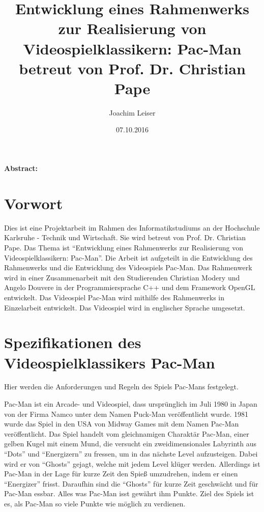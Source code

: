 \documentclass[a4paper, 11pt]{article}
\begin{document}
\author{Joachim Leiser}
\title{Entwicklung eines Rahmenwerks zur Realisierung von Videospielklassikern: Pac-Man betreut von Prof. Dr. Christian Pape}
\date{07.10.2016}
\maketitle

\pagebreak

\textbf{Abstract:}



\tableofcontents

\pagebreak

\section{Vorwort} %

Dies ist eine Projektarbeit im Rahmen des Informatikstudiums an der Hochschule Karlsruhe - Technik und Wirtschaft. Sie wird betreut von Prof. Dr. Christian Pape. Das Thema ist "`Entwicklung eines Rahmenwerks zur Realisierung von Videospielklassikern: Pac-Man"'. Die Arbeit ist aufgeteilt in die Entwicklung des Rahmenwerks und die Entwicklung des Videospiels Pac-Man. Das Rahmenwerk wird in einer Zusammenarbeit mit den Studierenden Christian Modery und Angelo Douvere in der Programmiersprache C++ und dem Framework OpenGL entwickelt. Das Videospiel Pac-Man wird mithilfe des Rahmenwerks in Einzelarbeit entwickelt. Das Videospiel wird in englischer Sprache umgesetzt.



\section{Spezifikationen des Videospielklassikers Pac-Man}
Hier werden die Anforderungen und Regeln des Spiels Pac-Mans festgelegt.

Pac-Man ist ein Arcade- und Videospiel, dass ursprünglich im Juli 1980 in Japan von der Firma Namco unter dem Namen Puck-Man veröffentlicht wurde\cite{WikiPacMan}. 1981 wurde das Spiel in den USA von Midway Games mit dem Namen Pac-Man veröffentlicht. Das Spiel handelt vom gleichnamigen Charaktär Pac-Man, einer gelben Kugel mit einem Mund, die versucht ein zweidimensionales Labyrinth aus "`Dots"' und "`Energizern"' zu fressen, um in das nächste Level aufzusteigen. Dabei wird er von "`Ghosts"' gejagt, welche mit jedem Level klüger werden. Allerdings ist Pac-Man in der Lage für kurze Zeit den Spieß umzudrehen, indem er einen "`Energizer"' frisst. Daraufhin sind die "`Ghosts"' für kurze Zeit geschwächt und für Pac-Man essbar. Alles was Pac-Man isst gewährt ihm Punkte. Ziel des Spiels ist es, als Pac-Man so viele Punkte wie möglich zu verdienen.
\end{document}
